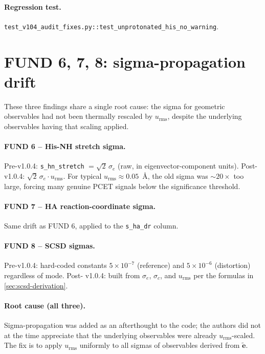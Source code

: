 \documentclass[10pt,a4paper,twoside]{article}
\newcommand{\evec}{\mathbf{e}}
\newcommand{\urms}{u_{\mathrm{rms}}}
\newcommand{\fn}[1]{\texttt{#1}}
\begin{document}
\paragraph{Regression test.}
\fn{test\_v104\_audit\_fixes.py::test\_unprotonated\_his\_no\_warning}.

\section{FUND 6, 7, 8: sigma-propagation drift}
\label{sec:fund-6-8}

These three findings share a single root cause: the sigma for
geometric observables had not been thermally rescaled by $\urms$,
despite the underlying observables having that scaling applied.

\paragraph{FUND 6 -- His-NH stretch sigma.}
Pre-v1.0.4: \texttt{s\_hn\_stretch} $= \sqrt{2}\,\sigma_e$ (raw,
in eigenvector-component units). Post-v1.0.4: $\sqrt{2}\,\sigma_e
\cdot \urms$. For typical $\urms \approx 0.05$~\AA{}, the old
sigma was $\sim 20\times$ too large, forcing many genuine PCET
signals below the significance threshold.

\paragraph{FUND 7 -- HA reaction-coordinate sigma.}
Same drift as FUND 6, applied to the \texttt{s\_ha\_dr} column.

\paragraph{FUND 8 -- SCSD sigmas.}
Pre-v1.0.4: hard-coded constants $5 \times 10^{-7}$ (reference)
and $5 \times 10^{-6}$ (distortion) regardless of mode. Post-
v1.0.4: built from $\sigma_e$, $\sigma_c$, and $\urms$ per the
formulas in \cref{sec:scsd-derivation}.

\paragraph{Root cause (all three).}
Sigma-propagation was added as an afterthought to the code; the
authors did not at the time appreciate that the underlying
observables were already $\urms$-scaled. The fix is to apply
$\urms$ uniformly to all sigmas of observables derived from
$\widetilde{\evec}$.
\end{document}
